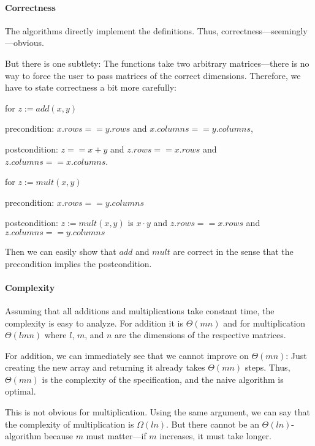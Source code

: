 \paragraph{Correctness}
The algorithms directly implement the definitions.
Thus, correctness---seemingly---obvious.

But there is one subtlety: The functions take two arbitrary matrices---there is no way to force the user to pass matrices of the correct dimensions.
Therefore, we have to state correctness a bit more carefully:
\begin{compactitem}
 \item for $z:=add(x,y)$
   \begin{compactitem}
     \item[precondition:] $x.rows==y.rows$ and $x.columns==y.columns$,
     \item[postcondition:] $z==x+y$ and $z.rows==x.rows$ and $z.columns==x.columns$.
   \end{compactitem}
 \item for $z:=mult(x,y)$
   \begin{compactitem}
     \item[precondition:]  $x.rows==y.columns$
     \item[postcondition:] $z:=mult(x,y)$ is $x\cdot y$ and $z.rows==x.rows$ and $z.columns==y.columns$
   \end{compactitem}
\end{compactitem}
Then we can easily show that $add$ and $mult$ are correct in the sense that the precondition implies the postcondition.

\paragraph{Complexity}
Assuming that all additions and multiplications take constant time, the complexity is easy to analyze.
For addition it is $\Theta(mn)$ and for multiplication $\Theta(lmn)$ where $l$, $m$, and $n$ are the dimensions of the respective matrices.

For addition, we can immediately see that we cannot improve on $\Theta(mn)$: Just creating the new array and returning it already takes $\Theta(mn)$ steps.
Thus, $\Theta(mn)$ is the complexity of the specification, and the naive algorithm is optimal.

This is not obvious for multiplication.
Using the same argument, we can say that the complexity of multiplication is $\Omega(ln)$.
But there cannot be an $\Theta(ln)$-algorithm because $m$ must matter---if $m$ increases, it must take longer.

